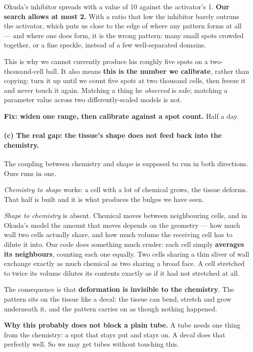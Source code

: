 \documentclass[11pt,a4paper]{article}
\begin{document}
Okuda's inhibitor spreads with a value of 10 against the activator's 1. \textbf{Our search allows
at most 2.} With a ratio that low the inhibitor barely outruns the activator, which puts us close
to the edge of where any pattern forms at all --- and where one does form, it is the wrong pattern:
many small spots crowded together, or a fine speckle, instead of a few well-separated domains.

This is why we cannot currently produce his roughly five spots on a two-thousand-cell ball. It also
means \textbf{this is the number we calibrate}, rather than copying: turn it up until we count five
spots at two thousand cells, then freeze it and never touch it again. Matching a thing he
\emph{observed} is safe; matching a parameter value across two differently-scaled models is not.

\textbf{Fix: widen one range, then calibrate against a spot count.} Half a day.

\paragraph{(c) The real gap: the tissue's shape does not feed back into the chemistry.}
The coupling between chemistry and shape is supposed to run in both directions. Ours runs in one.

\emph{Chemistry to shape} works: a cell with a lot of chemical grows, the tissue deforms. That half
is built and it is what produces the bulges we have seen.

\emph{Shape to chemistry} is absent. Chemical moves between neighbouring cells, and in Okuda's
model the amount that moves depends on the geometry --- how much wall two cells actually share, and
how much volume the receiving cell has to dilute it into. Our code does something much cruder: each
cell simply \textbf{averages its neighbours}, counting each one equally. Two cells sharing a thin
sliver of wall exchange exactly as much chemical as two sharing a broad face. A cell stretched to
twice its volume dilutes its contents exactly as if it had not stretched at all.

The consequence is that \textbf{deformation is invisible to the chemistry}. The pattern sits on the
tissue like a decal: the tissue can bend, stretch and grow underneath it, and the pattern carries on
as though nothing happened.

\textbf{Why this probably does not block a plain tube.} A tube needs one thing from the chemistry:
a spot that stays put and stays on. A decal does that perfectly well. So we may get tubes without
touching this.
\end{document}

